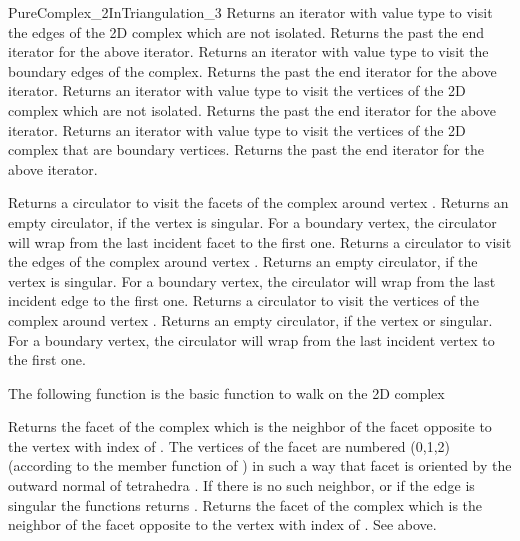 \begin{ccRefConcept}{PureComplex_2InTriangulation_3}
{Returns an iterator with value type  to visit the
edges of the 2D complex which are not isolated.}
\ccGlue
{}
{Returns the past the end iterator for the above iterator.}
\ccGlue
{}
{Returns an iterator with value type  to visit the
boundary  edges of the complex.}
\ccGlue
{}
{Returns the past the end iterator for the above iterator.}
\ccGlue
{}
{Returns an iterator with value type  to visit the
vertices of the 2D complex which are not isolated.}
\ccGlue
{}
{Returns the past the end iterator for the above iterator.}
\ccGlue
{}
{Returns an iterator with value type  to visit the 
vertices of the 2D complex that are  boundary vertices.}
\ccGlue
{}
{Returns the past the end iterator for the above iterator.}


{Returns a circulator to visit the facets of the complex around
vertex . Returns an empty circulator, if the vertex is 
singular. For a boundary  vertex,  the circulator will wrap from the last
incident facet  to the first one.}
\ccGlue
{}
{Returns a circulator to visit the edges of the complex around
vertex . Returns an empty circulator, if the vertex is 
singular. For a boundary  vertex,  the circulator will wrap from the last
incident edge  to the first one.}
\ccGlue
{}
{Returns a circulator to visit the vertices of the complex around
vertex . Returns an empty circulator, if the vertex  or
singular. For a boundary  vertex,  the circulator will wrap from the last
incident vertex  to the first one.}

The following function is the basic function to walk on the 2D
complex

{Returns the facet of the complex which is the neighbor of 
the facet  opposite to the vertex with index  of
.
The vertices of the facet  are numbered
(0,1,2) (according to the  member function
of )
in such a way that facet  is oriented by the
outward normal of tetrahedra . 
If there is no such neighbor, or if the edge is singular the functions returns .}
\ccGlue
{}
{Returns the facet of the complex which is the neighbor of 
the facet  opposite to the vertex with index  of .
See above.}





\end{ccRefConcept}

